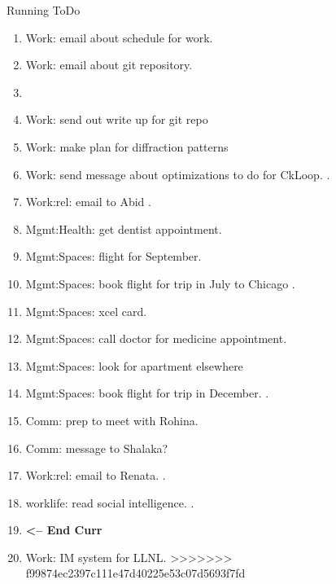 \begin{columns}
\begin{column}{0.5\columnwidth}
\begin{columns}
\begin{column}{0.6\linewidth}
\begin{block}{Running ToDo}
\begin{enumerate}
        \item \tiny Work: email about schedule for work. 
        \item \tiny Work: email about git repository. 
        \item \tiny 

        \item \tiny Work: send out write up for git repo 
        \item \tiny Work: make plan for diffraction patterns
        \item \tiny Work: send message about optimizations to do for
          CkLoop.  .
         
        \item \tiny Work:rel: email to Abid . 

        \item \tiny Mgmt:Health: get dentist appointment. 

        \item \tiny Mgmt:Spaces: flight for September. 
        \item \tiny Mgmt:Spaces: book flight for trip in July to Chicago .   
          
        \item \tiny Mgmt:Spaces: xcel card. 
        \item \tiny Mgmt:Spaces: call doctor for medicine appointment.

        \item \tiny Mgmt:Spaces: look for apartment elsewhere          

        \item \tiny Mgmt:Spaces: book flight for trip in December. .

        \item \tiny  Comm: prep to meet with Rohina. 
        \item \tiny Comm: message to Shalaka?
        \item \tiny Work:rel: email to Renata. .
        \item \tiny worklife: read social intelligence. .           
          
        \item \tiny \textbf{ <-- End Curr } 
          
        \item \tiny Work: IM system for LLNL.
>>>>>>> f99874ec2397c111e47d40225e53c07d5693f7fd
        \end{enumerate}
      \end{block}
      

\end{column}
\end{columns}
\end{column}
\end{columns}
